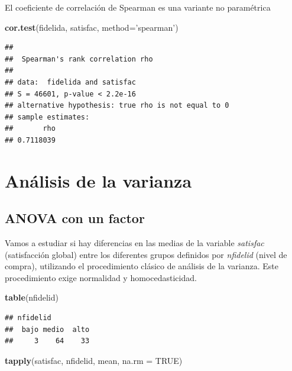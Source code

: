 \documentclass[]{book}
\newenvironment{Shaded}{\begin{snugshade}}{\end{snugshade}}
\newcommand{\KeywordTok}[1]{\textcolor[rgb]{0.13,0.29,0.53}{\textbf{#1}}}
\newcommand{\DataTypeTok}[1]{\textcolor[rgb]{0.13,0.29,0.53}{#1}}
\newcommand{\StringTok}[1]{\textcolor[rgb]{0.31,0.60,0.02}{#1}}
\newcommand{\OtherTok}[1]{\textcolor[rgb]{0.56,0.35,0.01}{#1}}
\newcommand{\NormalTok}[1]{#1}
\begin{document}
El coeficiente de correlación de Spearman es una variante no paramétrica

\begin{Shaded}
\begin{Highlighting}[]
\KeywordTok{cor.test}\NormalTok{(fidelida, satisfac, }\DataTypeTok{method=}\StringTok{'spearman'}\NormalTok{)}
\end{Highlighting}
\end{Shaded}

\begin{verbatim}
## 
##  Spearman's rank correlation rho
## 
## data:  fidelida and satisfac
## S = 46601, p-value < 2.2e-16
## alternative hypothesis: true rho is not equal to 0
## sample estimates:
##       rho 
## 0.7118039
\end{verbatim}

\section{Análisis de la varianza}\label{analisis-de-la-varianza}

\subsection{ANOVA con un factor}\label{anova-con-un-factor}

Vamos a estudiar si hay diferencias en las medias de la variable
\emph{satisfac} (satisfacción global) entre los diferentes grupos
definidos por \emph{nfidelid} (nivel de compra), utilizando el
procedimiento clásico de análisis de la varianza. Este procedimiento
exige normalidad y homocedasticidad.

\begin{Shaded}
\begin{Highlighting}[]
\KeywordTok{table}\NormalTok{(nfidelid)}
\end{Highlighting}
\end{Shaded}

\begin{verbatim}
## nfidelid
##  bajo medio  alto 
##     3    64    33
\end{verbatim}

\begin{Shaded}
\begin{Highlighting}[]
\KeywordTok{tapply}\NormalTok{(satisfac, nfidelid, mean, }\DataTypeTok{na.rm =} \OtherTok{TRUE}\NormalTok{)}
\end{Highlighting}
\end{Shaded}
\end{document}

